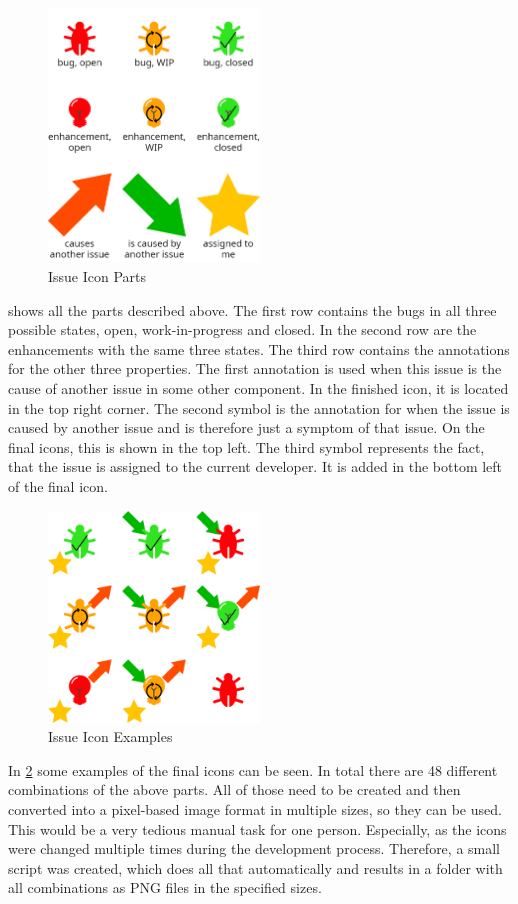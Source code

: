\begin{figure}[!h]
	\centering
	\includegraphics[width=0.5\textwidth]{graphics/iconParts.png}
	\caption{Issue Icon Parts}
	\label{fig:c4:icon_parts}
\end{figure}
 shows all the parts described above.
The first row contains the bugs in all three possible states, open, work-in-progress and closed.
In the second row are the enhancements with the same three states.
The third row contains the annotations for the other three properties.
The first annotation is used when this issue is the cause of another issue in some other component.
In the finished icon, it is located in the top right corner.
The second symbol is the annotation for when the issue is caused by another issue and is therefore just a symptom of that issue.
On the final icons, this is shown in the top left.
The third symbol represents the fact, that the issue is assigned to the current developer.
It is added in the bottom left of the final icon.

\begin{figure}[!h]
	\centering
	\includegraphics[width=0.5\textwidth]{graphics/iconCombinations.png}
	\caption{Issue Icon Examples}
	\label{fig:c4:icon_combinations}
\end{figure}
In \cref{fig:c4:icon_combinations} some examples of the final icons can be seen.
In total there are 48 different combinations of the above parts.
All of those need to be created and then converted into a pixel-based image format in multiple sizes, so they can be used.
This would be a very tedious manual task for one person.
Especially, as the icons were changed multiple times during the development process.
Therefore, a small script was created, which does all that automatically and results in a folder with all combinations as \gls{PNG} files in the specified sizes.

